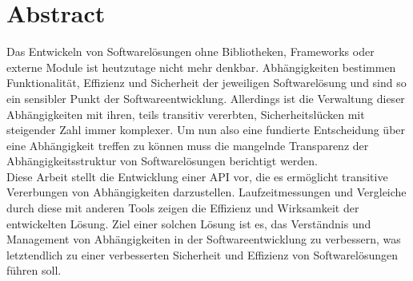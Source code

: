 \section{Abstract} \label{sec:abstract}
Das Entwickeln von Softwarelösungen ohne Bibliotheken, Frameworks oder externe Module ist heutzutage nicht mehr denkbar.
Abhängigkeiten bestimmen Funktionalität, Effizienz und Sicherheit der jeweiligen Softwarelösung und sind so ein sensibler Punkt der Softwareentwicklung.
Allerdings ist die Verwaltung dieser Abhängigkeiten mit ihren, teils transitiv vererbten, Sicherheitslücken mit steigender Zahl immer komplexer.
Um nun also eine fundierte Entscheidung über eine Abhängigkeit treffen zu können muss die mangelnde Transparenz der Abhängigkeitsstruktur von Softwarelösungen berichtigt werden.
\\
Diese Arbeit stellt die Entwicklung einer API vor, die es ermöglicht transitive Vererbungen von Abhängigkeiten darzustellen.
Laufzeitmessungen und Vergleiche durch diese mit anderen Tools zeigen die Effizienz und Wirksamkeit der entwickelten Lösung.
Ziel einer solchen Lösung ist es, das Verständnis und Management von Abhängigkeiten in der Softwareentwicklung zu verbessern, was letztendlich zu einer verbesserten Sicherheit und Effizienz von Softwarelösungen führen soll.
